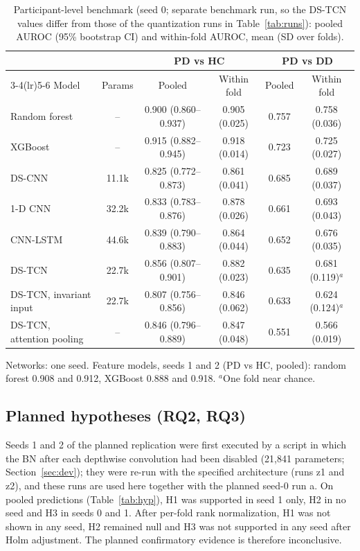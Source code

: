 \documentclass[preprint,12pt]{elsarticle}
\begin{document}
\begin{table}[!t]
\caption{Participant-level benchmark (seed 0; separate benchmark run, so the DS-TCN values differ from those of the quantization runs in Table~\ref{tab:runs}): pooled AUROC (95\% bootstrap CI) and within-fold AUROC, mean (SD over folds).}
\label{tab:main}
\centering\scriptsize
\setlength{\tabcolsep}{2.5pt}
\begin{tabular*}{\linewidth}{@{\extracolsep{\fill}}lccccc@{}}
\toprule
 & & \multicolumn{2}{c}{PD vs HC} & \multicolumn{2}{c}{PD vs DD} \\
\cmidrule(lr){3-4}\cmidrule(lr){5-6}
Model & Params & Pooled & Within fold & Pooled & Within fold \\
\midrule
Random forest & -- & 0.900 (0.860--0.937) & 0.905 (0.025) & 0.757 & 0.758 (0.036) \\
XGBoost & -- & 0.915 (0.882--0.945) & 0.918 (0.014) & 0.723 & 0.725 (0.027) \\
DS-CNN & 11.1k & 0.825 (0.772--0.873) & 0.861 (0.041) & 0.685 & 0.689 (0.037) \\
1-D CNN & 32.2k & 0.833 (0.783--0.876) & 0.878 (0.026) & 0.661 & 0.693 (0.043) \\
CNN-LSTM & 44.6k & 0.839 (0.790--0.883) & 0.864 (0.044) & 0.652 & 0.676 (0.035) \\
DS-TCN & 22.7k & 0.856 (0.807--0.901) & 0.882 (0.023) & 0.635 & 0.681 (0.119)$^{a}$ \\
DS-TCN, invariant input & 22.7k & 0.807 (0.756--0.856) & 0.846 (0.062) & 0.633 & 0.624 (0.124)$^{a}$ \\
DS-TCN, attention pooling & -- & 0.846 (0.796--0.889) & 0.847 (0.048) & 0.551 & 0.566 (0.019) \\
\bottomrule
\end{tabular*}

\vspace{2pt}\parbox{\linewidth}{\footnotesize Networks: one seed. Feature models, seeds 1 and 2 (PD vs HC, pooled): random forest 0.908 and 0.912, XGBoost 0.888 and 0.918. $^{a}$One fold near chance.}
\end{table}

\subsection{Planned hypotheses (RQ2, RQ3)}
\label{sec:planned}
Seeds 1 and 2 of the planned replication were first executed by a script in which the BN after each depthwise convolution had been disabled (21,841 parameters; Section~\ref{sec:dev}); they were re-run with the specified architecture (runs z1 and z2), and these runs are used here together with the planned seed-0 run a. On pooled predictions (Table~\ref{tab:hyp}), H1 was supported in seed 1 only, H2 in no seed and H3 in seeds 0 and 1. After per-fold rank normalization, H1 was not shown in any seed, H2 remained null and H3 was not supported in any seed after Holm adjustment. The planned confirmatory evidence is therefore inconclusive.
\end{document}
